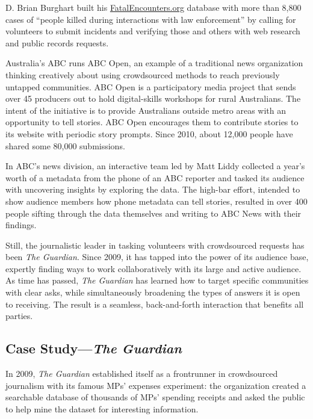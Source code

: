 \documentclass[notoc, symmetric, nobib, nols]{towcenter-guideto-book}
\begin{document}
D. Brian Burghart built his \href{http://www.fatalencounters.org}{FatalEncounters.org} database with more than 8,800 cases of ``people killed during interactions with law enforcement'' by calling for volunteers to submit incidents and verifying those and others with web research and public records requests.%

Australia's ABC runs ABC Open,\autocite{ABCOpen} an example of a traditional news organization thinking creatively about using crowdsourced methods to reach previously untapped communities. ABC Open is a participatory media project that sends over 45 producers out to hold digital-skills workshops for rural Australians. The intent of the initiative is to provide Australians outside metro areas with an opportunity to tell stories. ABC Open encourages them to contribute stories to its website with periodic story prompts. Since 2010, about 12,000 people have shared some 80,000 submissions. 

In ABC's news division, an interactive team led by Matt Liddy collected a year's worth of a metadata from the phone of an ABC reporter and tasked its audience with uncovering insights by exploring the data.%
 The high-bar effort, intended to show audience members how phone metadata can tell stories, resulted in over 400 people sifting through the data themselves and writing to ABC News with their findings.\autocite{ABCNews}

Still, the journalistic leader in tasking volunteers with crowdsourced requests has been \textit{The Guardian}. Since 2009, it has tapped into the power of its audience base, expertly finding ways to work collaboratively with its large and active audience. As time has passed, \textit{The Guardian} has learned how to target specific communities with clear asks, while simultaneously broadening the types of answers it is open to receiving. The result is a seamless, back-and-forth interaction that benefits all parties. 

\subsection{Case Study---\textit{The Guardian}}

In 2009, \textit{The Guardian} established itself as a frontrunner in crowdsourced journalism with its famous MPs' expenses experiment: the organization created a searchable database of thousands of MPs' spending receipts and asked the public to help mine the dataset for interesting information.
\end{document}
